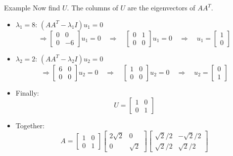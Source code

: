 \documentclass[10pt]{beamer}
\begin{document}
\begin{frame}{Example}
Now find $U$.  The columns of $U$ are the eigenvectors of $A A^T$.
\begin{itemize}
    \item $\lambda_1=8$:  $(A A^T - \lambda_1 I) u_1 = 0$
\[
\Rightarrow 
\begin{bmatrix}
 0 & 0\\
 0 & -6 
\end{bmatrix}
u_1 = 0
\quad
\Rightarrow 
\quad
\begin{bmatrix}
0 & 1\\
0 & 0
\end{bmatrix}
u_1 = 0
\quad
\Rightarrow 
\quad
u_1 = 
\begin{bmatrix}
1 \\
0
\end{bmatrix}
\]
    \item $\lambda_2=2$:  $(A A^T - \lambda_2 I) u_2 = 0$
\[
\Rightarrow 
\begin{bmatrix}
 6 & 0\\
 0 & 0
\end{bmatrix}
u_2 = 0
\quad
\Rightarrow 
\quad
\begin{bmatrix}
1 & 0\\
0 & 0
\end{bmatrix}
u_2 = 0
\quad
\Rightarrow 
\quad
u_2 = 
\begin{bmatrix}
0 \\
1
\end{bmatrix}
\]
    \item Finally:
\[
U=
\begin{bmatrix}
1 & 0\\
 0 & 1
\end{bmatrix}
\]

    \item Together:
\[
A = 
\begin{bmatrix}
1 & 0\\
 0 & 1
\end{bmatrix}
\begin{bmatrix}
2\sqrt{2} & 0\\
        0 & \sqrt{2}
\end{bmatrix}
\begin{bmatrix}
\sqrt{2}/2 & -\sqrt{2}/2\\
 \sqrt{2}/2 & \sqrt{2}/2
\end{bmatrix}
\]
\end{itemize}
\end{frame}
\end{document}
